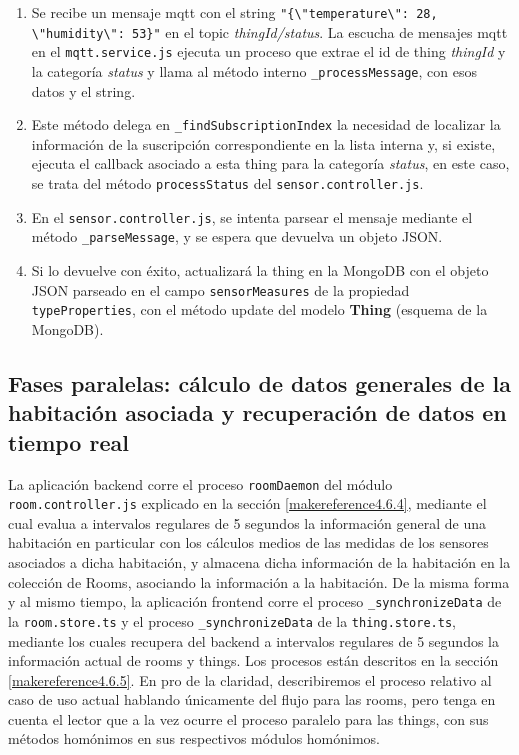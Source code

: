 \begin{enumerate}
\item  Se recibe un mensaje \gls{mqtt} con el string \verb|"{\"temperature\": 28, \"humidity\": 53}"| en el topic \textit{thingId/status}. La escucha de mensajes \gls{mqtt} en el \verb|mqtt.service.js| ejecuta un proceso que extrae el id de thing \textit{thingId} y la categoría \textit{status} y llama al método interno \verb|_processMessage|, con esos datos y el string.

\item  Este método delega en \verb|_findSubscriptionIndex| la necesidad de localizar la información de la suscripción correspondiente en la lista interna y, si existe, ejecuta el callback asociado a esta thing para la categoría \textit{status}, en este caso, se trata del método \verb|processStatus| del \verb|sensor.controller.js|.

\item  En el \verb|sensor.controller.js|, se intenta parsear el mensaje mediante el método \verb|_parseMessage|, y se espera que devuelva un objeto JSON.

\item  Si lo devuelve con éxito, actualizará la thing en la MongoDB con el objeto JSON parseado en el campo \verb|sensorMeasures| de la propiedad \verb|typeProperties|, con el método update del modelo \textbf{Thing} (esquema de la MongoDB).
\end{enumerate}

\subsection{Fases paralelas: cálculo de datos generales de la habitación asociada y recuperación de datos en tiempo real}
\label{ch:Capitulo5.4.3}
La aplicación backend corre el proceso \verb|roomDaemon| del módulo \verb|room.controller.js| explicado en la sección \ref{makereference4.6.4}, mediante el cual evalua a intervalos regulares de 5 segundos la información general de una habitación en particular con los cálculos medios de las medidas de los sensores asociados a dicha habitación, y almacena dicha información de la habitación en la colección de Rooms, asociando la información a la habitación.
\vspace{0.5cm}
De la misma forma y al mismo tiempo, la aplicación frontend corre el proceso \verb|_synchronizeData| de la \verb|room.store.ts| y el proceso \verb|_synchronizeData| de la \verb|thing.store.ts|, mediante los cuales recupera del backend a intervalos regulares de 5 segundos la información actual de rooms y things. Los procesos están descritos en la sección \ref{makereference4.6.5}. En pro de la claridad, describiremos el proceso relativo al caso de uso actual hablando únicamente del flujo para las rooms, pero tenga en cuenta el lector que a la vez ocurre el proceso paralelo para las things, con sus métodos homónimos en sus respectivos módulos homónimos.

